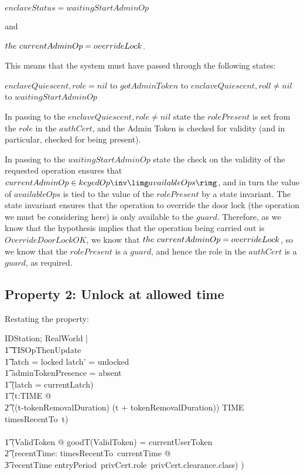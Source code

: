 $enclaveStatus = waitingStartAdminOp$

and

$the~ currentAdminOp = overrideLock$.

This means that the system must have passed through the following states:

$enclaveQuiescent, role=nil$ to $gotAdminToken$
to $enclaveQuiescent, roll \neq nil$ to $waitingStartAdminOp$

In passing to the $enclaveQuiescent, role \neq nil$ state
the $rolePresent$ is set from the $role$ in the $authCert$,
and the Admin Token is checked for validity
(and in particular, checked for being present).

In passing to the $waitingStartAdminOp$ state the check on the validity
of the requested operation ensures that
$currentAdminOp \in keyedOp \inv \limg availableOps \rimg$,
and in turn the value of $availableOps$ is tied to the value of the
$rolePresent$ by a state invariant.
The state invariant ensures that the operation to override the door lock
(the operation we must be considering here)
is only available to the $guard$.
Therefore, as we know that the hypothesis implies that the operation being
carried out is $OverrideDoorLockOK$,
we know that $the~ currentAdminOp = overrideLock$,
so we know that the $rolePresent$ is a $guard$,
and hence the role in the $authCert$ is a $guard$, as required.
\subsection{Property 2: Unlock at allowed time}
\label{sec:UnlockTimeArg}
Restating the property:

\begin{zed}
\Delta IDStation; \Delta RealWorld |
\\ \t1	TISOpThenUpdate
\\ \t1	\land latch = locked \land latch' = unlocked
\\ \t1	\land adminTokenPresence = absent
\\ \t1	\land (latch = currentLatch)
\\ \t1	\land (\forall t:TIME @
\\ \t2		((t-tokenRemovalDuration) \upto (t + tokenRemovalDuration)) \cap TIME \subseteq timesRecentTo~t)
\\ \shows
\\ \t1	(\exists ValidToken @ goodT(\theta ValidToken) = currentUserToken
\\ \t2	\land
		(\exists recentTime: timesRecentTo~currentTime @
\\ \t3			recentTime \in entryPeriod~privCert.role~privCert.clearance.class)
	)
\end{zed}

